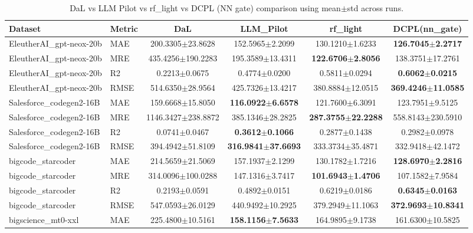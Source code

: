\begin{table}[t]
\centering
\small
\caption{DaL vs LLM Pilot vs rf\_light vs DCPL (NN gate) comparison using mean$\pm$std across runs.}
\label{tab:dal_llmpilot_rflight_dcpl}
\begin{tabular}{llcccc}
\toprule
Dataset & Metric & DaL & LLM\_Pilot & rf\_light & DCPL(nn\_gate) \\
\midrule
EleutherAI\_gpt-neox-20b & MAE & 200.3305$\pm$23.8628 & 152.5965$\pm$2.2099 & 130.1210$\pm$1.6233 & \textbf{126.7045$\pm$2.2717} \\
EleutherAI\_gpt-neox-20b & MRE & 435.4256$\pm$190.2283 & 195.3589$\pm$13.4311 & \textbf{122.6706$\pm$2.8056} & 138.3751$\pm$17.2761 \\
EleutherAI\_gpt-neox-20b & R2 & 0.2213$\pm$0.0675 & 0.4774$\pm$0.0200 & 0.5811$\pm$0.0294 & \textbf{0.6062$\pm$0.0215} \\
EleutherAI\_gpt-neox-20b & RMSE & 514.6350$\pm$28.9564 & 425.7326$\pm$13.4217 & 380.8884$\pm$12.0515 & \textbf{369.4246$\pm$11.0585} \\
\addlinespace
Salesforce\_codegen2-16B & MAE & 159.6668$\pm$15.8050 & \textbf{116.0922$\pm$6.6578} & 121.7600$\pm$6.3091 & 123.7951$\pm$9.5125 \\
Salesforce\_codegen2-16B & MRE & 1146.3427$\pm$238.8872 & 385.1346$\pm$28.2825 & \textbf{287.3755$\pm$22.2288} & 558.8143$\pm$230.5910 \\
Salesforce\_codegen2-16B & R2 & 0.0741$\pm$0.0467 & \textbf{0.3612$\pm$0.1066} & 0.2877$\pm$0.1438 & 0.2982$\pm$0.0978 \\
Salesforce\_codegen2-16B & RMSE & 394.4942$\pm$51.8109 & \textbf{316.9841$\pm$37.6693} & 333.3734$\pm$35.4871 & 332.9418$\pm$42.1472 \\
\addlinespace
bigcode\_starcoder & MAE & 214.5659$\pm$21.5069 & 157.1937$\pm$2.1299 & 130.1782$\pm$1.7216 & \textbf{128.6970$\pm$2.2816} \\
bigcode\_starcoder & MRE & 314.0096$\pm$100.0288 & 147.1316$\pm$3.7417 & \textbf{101.6943$\pm$1.4706} & 107.1582$\pm$7.9584 \\
bigcode\_starcoder & R2 & 0.2193$\pm$0.0591 & 0.4892$\pm$0.0151 & 0.6219$\pm$0.0186 & \textbf{0.6345$\pm$0.0163} \\
bigcode\_starcoder & RMSE & 547.0593$\pm$26.0129 & 440.9492$\pm$10.2925 & 379.2949$\pm$11.1063 & \textbf{372.9693$\pm$10.8341} \\
\addlinespace
bigscience\_mt0-xxl & MAE & 225.4800$\pm$10.5161 & \textbf{158.1156$\pm$7.5633} & 164.9895$\pm$9.1738 & 161.6300$\pm$10.5825 \\

\end{tabular}
\end{table}

